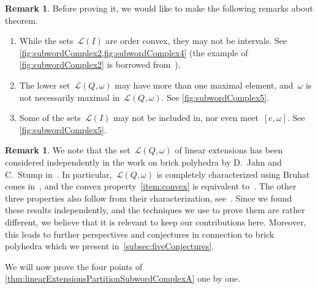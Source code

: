 \documentclass[reqno]{amsart}
\theoremstyle{definition}
\newtheorem{remark}[theorem]{Remark}
\newcommand{\linearExtensions}{\mathcal{L}} %
\begin{document}
\pagebreak
\begin{remark}
\label{rem:linearExtensionsPartitionSubwordComplexA}
Before proving it, we would like to make the following remarks about theorem.
\begin{enumerate}
\item While the sets~$\linearExtensions(I)$ are order convex, they may not be intervals. See \cref{fig:subwordComplex2,fig:subwordComplex4} (the example of \cref{fig:subwordComplex2} is borrowed from~\cite[Figure~9]{PilaudStump-brickPolytope}).
\item The lower set~$\linearExtensions(Q,\omega)$ may have more than one maximal element, and~$\omega$ is not necessarily maximal in~$\linearExtensions(Q,\omega)$. See \cref{fig:subwordComplex5}.
\item Some of the sets~$\linearExtensions(I)$ may not be included in, nor even meet~$[e,\omega]$. See \cref{fig:subwordComplex5}.
\end{enumerate}
\end{remark}

\begin{remark}
We note that the set~$\linearExtensions(Q,\omega)$ of linear extensions has been considered independently in the work on brick polyhedra by D.~Jahn and C.~Stump in~\cite{JahnStump}. In particular,~$\linearExtensions(Q,\omega)$ is completely characterized using Bruhat cones in~\cite[Prop.~4.12]{JahnStump}, and the convex property~\eqref{item:convex} is equivalent to~\cite[Lem.~4.13]{JahnStump}. The other three properties also follow from their characterization, see~\cite[Sect.~4.2]{JahnStump}.  
Since we found these results independently, and the techniques we use to prove them are rather different, we believe that it is relevant to keep our contributions here. Moreover, this leads to further perspectives and conjectures in connection to brick polyhedra which we present in~\cref{subsec:fiveConjectures}. 
\end{remark}

We will now prove the four points of \cref{thm:linearExtensionsPartitionSubwordComplexA} one by one.
\end{document}
